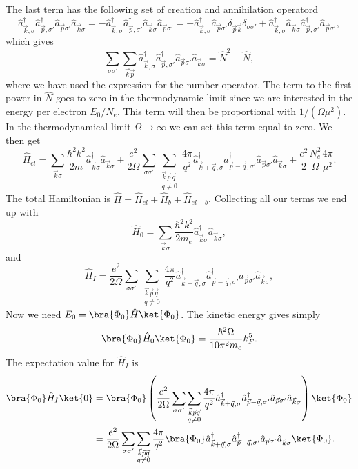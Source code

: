 The last term has the following set of creation and annihilation operatord
\[ \hat a_{\vec k, \sigma}^\dagger \hat a_{\vec p, \sigma'}^\dagger \hat a_{\vec p \sigma'} \hat a_{\vec k \sigma} =
- \hat a_{\vec k, \sigma}^\dagger \hat a_{\vec p, \sigma'}^\dagger \hat a_{\vec k \sigma} \hat a_{\vec p \sigma'} =
- \hat a_{\vec k, \sigma}^\dagger \hat a_{\vec p \sigma'} \delta_{\vec p \vec k} \delta_{\sigma \sigma'} + \hat a_{\vec k, \sigma}^\dagger \hat a_{\vec k \sigma} \hat a_{\vec p, \sigma'}^\dagger \hat a_{\vec p \sigma'} , \]
which gives
\[ \sum_{\sigma \sigma'} \sum_{\vec k \vec p} \hat a_{\vec k, \sigma}^\dagger \hat a_{\vec p, \sigma'}^\dagger \hat a_{\vec p \sigma'} \hat a_{\vec k \sigma} =
\hat N^2 - \hat N , \]
where we have used the expression for the number operator.  The term to the first power in $\hat N$ 
goes to zero in the thermodynamic limit since we are interested in the energy per electron $E_0/N_e$. This term will then be proportional with $1/(\Omega \mu^2)$. 
In the thermodynamical limit $\Omega\rightarrow \infty$ we can set this term equal to zero.
We then get
%
\[ \hat H_{el} = \sum_{\vec k \sigma} \frac{\hbar^2 k^2}{2m} \hat a_{\vec k \sigma}^\dagger \hat a_{\vec k \sigma} +
\frac{e^2}{2\Omega} \sum_{\sigma \sigma'} \sum_{\substack{\vec k \vec p \vec q \\ q \neq 0}} \frac{4\pi}{q^2}
\hat a_{\vec k + \vec q, \sigma}^\dagger \hat a_{\vec p - \vec q, \sigma'}^\dagger \hat a_{\vec p \sigma'} \hat a_{\vec k \sigma} +
\frac{e^2}{2} \frac{N_e^2}{\Omega} \frac{4\pi}{\mu^2}. \]
%
The total Hamiltonian is $\hat H = \hat H_{el} + \hat H_{b} + \hat H_{el-b}$. 
Collecting all our terms we end up with
\[
\hat H_0 = \sum_{\vec k \sigma} \frac{\hbar^2 k^2}{2m_e} \hat a_{\vec k \sigma}^\dagger \hat a_{\vec k \sigma},
\]
and
\[
\hat H_I = \frac{e^2}{2\Omega} \sum_{\sigma \sigma'} \sum_{\substack{\vec k \vec p \vec q \\ q \neq 0}} \frac{4\pi}{q^2}
\hat a_{\vec k + \vec q, \sigma}^\dagger \hat a_{\vec p - \vec q, \sigma'}^\dagger \hat a_{\vec p \sigma'} \hat a_{\vec k \sigma},
\]
Now we need $E_0 = \bra{\Phi_0} \hat H \ket{\Phi_0}$.
The kinetic energy gives  simply
\[
\bra{\Phi_0} \hat H_0 \ket{\Phi_0} =
\frac{\hbar^2 \Omega}{10\pi^2 m_e} k_F^5 .
\]
The expectation value for  $\hat H_I$ is
\begin{align*}
\bra{\Phi_0} \hat H_I \ket{0} &=
\bra{\Phi_0} \left( \frac{e^2}{2\Omega} \sum_{\sigma \sigma'} \sum_{\substack{\vec k \vec p \vec q \\ q \neq 0}} \frac{4\pi}{q^2}
\hat a_{\vec k + \vec q, \sigma}^\dagger \hat a_{\vec p - \vec q, \sigma'}^\dagger \hat a_{\vec p \sigma'} \hat a_{\vec k \sigma} \right) \ket{\Phi_0} \\
%
&= \frac{e^2}{2\Omega} \sum_{\sigma \sigma'} \sum_{\substack{\vec k \vec p \vec q \\ q \neq 0}} \frac{4\pi}{q^2} \bra{\Phi_0}
\hat a_{\vec k + \vec q, \sigma}^\dagger \hat a_{\vec p - \vec q, \sigma'}^\dagger \hat a_{\vec p \sigma'} \hat a_{\vec k \sigma} \ket{\Phi_0}.
\end{align*}

